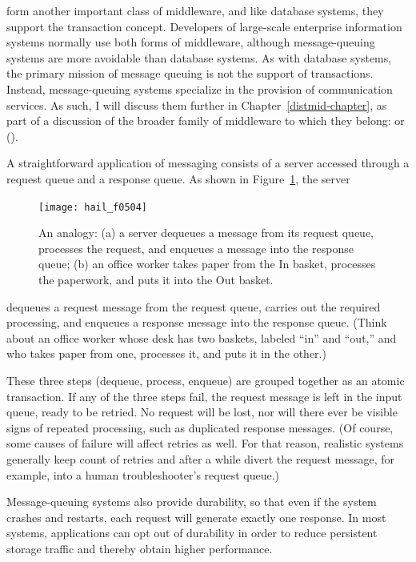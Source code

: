  form
another important class of middleware, and like database systems, they
support the transaction concept.  
Developers of large-scale enterprise information systems normally use both forms of
middleware, although message-queuing systems are more avoidable than
database systems.
As with database systems, the
primary mission of message queuing is not the support of
transactions.  Instead, message-queuing systems specialize in the
provision of communication services. As such, I will discuss them further
in Chapter~\ref{distmid-chapter}, as part of a discussion
of the broader family of middleware to which they belong:
 or
 ().

A straightforward application of messaging consists of a server
accessed through a request queue and a response queue.  
As shown in Figure~\ref{scan-5-4}, the server
\begin{figure}
\centerline{\texttt{[image: hail\_f0504]}}
\caption{An analogy: (a) a server dequeues a message from its request
  queue, processes the request, and enqueues a message into the response queue; (b) an
  office worker takes paper from the In basket, processes the
  paperwork, and puts it into the Out basket.}
\label{scan-5-4}
\end{figure}
dequeues a request message from the request queue, carries out the
required processing, and enqueues a response message into the response
queue.  (Think about an office worker whose desk has two baskets,
labeled ``in'' and ``out,'' and who takes paper from one, processes it, and
puts it in the other.)

These three steps (dequeue, process, enqueue) are grouped together as
an atomic transaction.  If any of the three steps fail, the request
message is left in the input queue, ready to be retried.  No request
will be lost, nor will there ever be visible signs of repeated
processing, such as duplicated response messages.  (Of course, some
causes of failure will affect retries as well.  For that reason,
realistic systems generally keep count of retries and after a while
divert the request message, for example, into a human troubleshooter's
request queue.)

Message-queuing systems also provide durability, so that even if the system crashes and restarts,
each request will generate exactly one response.
In most systems, applications can opt out of durability in order to reduce persistent storage traffic and thereby
obtain higher performance.

